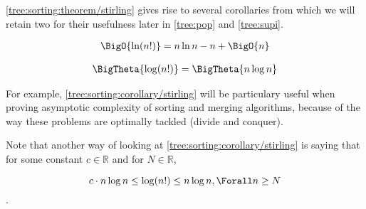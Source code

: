 \ref{tree:sorting:theorem/stirling} gives rise to several corollaries from which we will retain two for their usefulness later in \ref{tree:pop} and \ref{tree:supi}.



\begin{corollary}
\begin{align*}
\BigO{\ln(n!)} &= n \ln n - n + \BigO{n}\\
\end{align*}
\end{corollary}



\begin{corollary}
\label{tree:sorting:corollary/stirling}
\begin{align*}
\BigTheta{\log(n!)} &= \BigTheta{n \log n}\\
\end{align*}
\end{corollary}


For example, \ref{tree:sorting:corollary/stirling} will be particulary useful when proving asymptotic complexity of sorting and merging algorithms, because of the way these problems are optimally tackled (divide and conquer).

Note that another way of looking at \ref{tree:sorting:corollary/stirling} is saying that for some constant $c \in \mathbb{R}$ and for $N \in \mathbb{R}$,


$$c \cdot n \log n \leq \log(n!) \leq n \log n, \Forall n \geq N$$.
